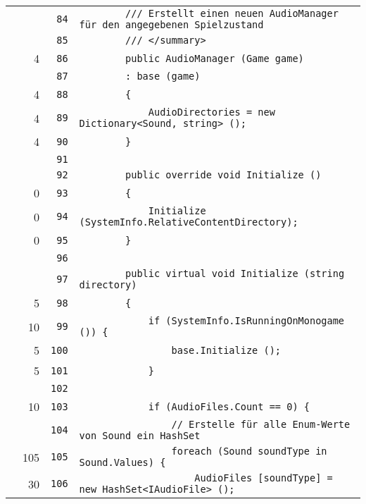 \documentclass[a4paper,10pt]{article}
\begin{document}
\begin{longtable}[l]{lrrl}
\cellcolor{gray} &  & \verb~84~ & \verb~        /// Erstellt einen neuen AudioManager für den angegebenen Spielzustand~\\
\cellcolor{gray} &  & \verb~85~ & \verb~        /// </summary>~\\
\cellcolor{green} & 4 & \verb~86~ & \verb~        public AudioManager (Game game)~\\
\cellcolor{gray} &  & \verb~87~ & \verb~        : base (game)~\\
\cellcolor{green} & 4 & \verb~88~ & \verb~        {~\\
\cellcolor{green} & 4 & \verb~89~ & \verb~            AudioDirectories = new Dictionary<Sound, string> ();~\\
\cellcolor{green} & 4 & \verb~90~ & \verb~        }~\\
\cellcolor{gray} &  & \verb~91~ & \verb~~\\
\cellcolor{gray} &  & \verb~92~ & \verb~        public override void Initialize ()~\\
\cellcolor{red} & 0 & \verb~93~ & \verb~        {~\\
\cellcolor{red} & 0 & \verb~94~ & \verb~            Initialize (SystemInfo.RelativeContentDirectory);~\\
\cellcolor{red} & 0 & \verb~95~ & \verb~        }~\\
\cellcolor{gray} &  & \verb~96~ & \verb~~\\
\cellcolor{gray} &  & \verb~97~ & \verb~        public virtual void Initialize (string directory)~\\
\cellcolor{green} & 5 & \verb~98~ & \verb~        {~\\
\cellcolor{green} & 10 & \verb~99~ & \verb~            if (SystemInfo.IsRunningOnMonogame ()) {~\\
\cellcolor{green} & 5 & \verb~100~ & \verb~                base.Initialize ();~\\
\cellcolor{green} & 5 & \verb~101~ & \verb~            }~\\
\cellcolor{gray} &  & \verb~102~ & \verb~~\\
\cellcolor{green} & 10 & \verb~103~ & \verb~            if (AudioFiles.Count == 0) {~\\
\cellcolor{gray} &  & \verb~104~ & \verb~                // Erstelle für alle Enum-Werte von Sound ein HashSet~\\
\cellcolor{green} & 105 & \verb~105~ & \verb~                foreach (Sound soundType in Sound.Values) {~\\
\cellcolor{green} & 30 & \verb~106~ & \verb~                    AudioFiles [soundType] = new HashSet<IAudioFile> ();~\\

\end{longtable}
\end{document}
